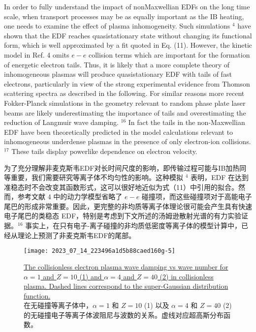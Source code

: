 \documentclass[oneside,onecolumn]{article}
\newcommand\enzhbox[2]{
  	\quad\par \begin{paracol}{2} \colseprulecolor{black} 
  			\begin{spacing}{1.0}
  				\footnotesize  #1
  			\end{spacing}
  		\switchcolumn[1] 
  		#2
  	\end{paracol} 
  }
\begin{document}
\begin{sloppypar}
 
\enzhbox{   In order to fully understand the impact of nonMaxwellian EDFs on the long time scale, when transport processes may be as equally important as the IB heating, one needs to examine the effect of plasma inhomogeneity. Such simulations $^{4}$ have shown that the EDF reaches quasistationary state without changing its functional form, which is well approximated by a fit quoted in Eq. (11). However, the kinetic model in Ref. 4 omits $e-e$ collision terms which are important for the formation of energetic electron tails. Thus, it is likely that a more complete theory of inhomogeneous plasmas will produce quasistationary EDF with tails of fast electrons, particularly in view of the strong experimental evidence from Thomson scattering spectra as described in the following. For similar reasons more recent Fokker-Planck simulations in the geometry relevant to random phase plate laser beams are likely underestimating the importance of tails and overestimating the reduction of Langmuir wave damping. ${ }^{16}$ In fact the tails in the non-Maxwellian EDF have been theoretically predicted in the model calculations relevant to inhomogeneous underdense plasmas in the presence of only electron-ion collisions. ${ }^{17}$ These tails display powerlike dependence on electron velocity.
}{
为了充分理解非麦克斯韦EDF对长时间尺度的影响，即传输过程可能与IB加热同等重要，我们需要研究等离子体不均匀性的影响。这种模拟 $^{4}$ 表明，EDF 在达到准稳态时不会改变其函数形式，这可以很好地近似为式（11）中引用的拟合。然而，参考文献 4 中的动力学模型省略了 $e-e$ 碰撞项，而这些碰撞项对于高能电子尾巴的形成非常重要。因此，更完整的非均质等离子体理论很可能会产生具有快速电子尾巴的类稳态 EDF，特别是考虑到下文所述的汤姆逊散射光谱的有力实验证据。${ }^{16}$ 事实上，在只有电子-离子碰撞的非均质低密度等离子体的模型计算中，已经从理论上预测了非麦克斯韦EDF的尾部。

}
  
  \begin{figure}[tbp]
  	\centering
  	\texttt{[image: 2023\_07\_14\_223496a1d5b88caed160g-5]}
  	\caption{\uline{The collisionless electron plasma wave damping vs wave number for $\alpha=1$ and $Z=10$ (1) and $\alpha=4$ and $Z=40$ (2) in collisionless plasma. Dashed lines correspond to the super-Gaussian distribution function.}\\在无碰撞等离子体中，$\alpha=1$ 和 $Z=10$ (1) 以及 $\alpha=4$ 和 $Z=40$ (2) 的无碰撞电子等离子体波阻尼与波数的关系。虚线对应超高斯分布函数。}
  	\label{fig5.}
  \end{figure}
  

\end{sloppypar}
\end{document}
